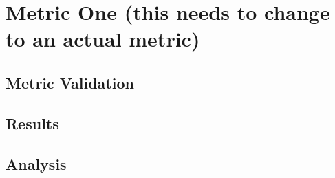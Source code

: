 \section{Metric One \FIXME(this needs to change to an actual metric)}

\subsection{Metric Validation}

\subsection{Results}

\subsection{Analysis}
